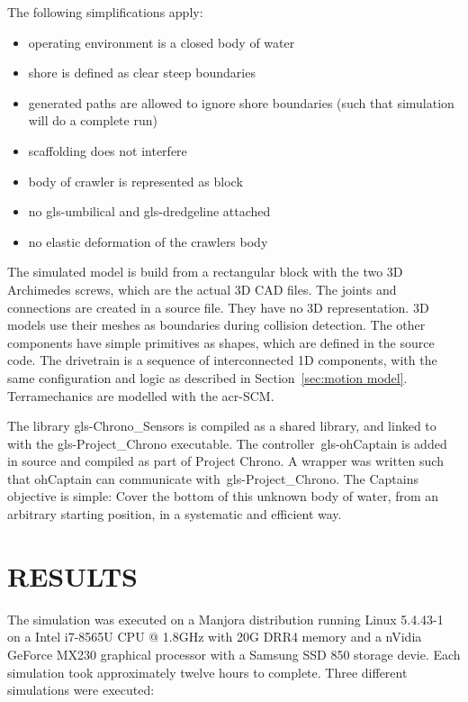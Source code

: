 \noindent The following simplifications apply:

\begin{itemize}
    \setlength\itemsep{0mm}
    \item operating environment is a closed body of water
    \item shore is defined as clear steep boundaries
    \item generated paths are allowed to ignore shore boundaries (such that simulation will do a complete run)
    \item scaffolding does not interfere
    \item body of crawler is represented as block
    \item no \gls{gls-umbilical} and \gls{gls-dredgeline} attached
    \item no elastic deformation of the crawlers body
\end{itemize}

The simulated model is build from a rectangular block with the two 3D Archimedes screws, which are the actual 3D CAD
files. The joints and connections are created in a source file. They have no 3D representation. 3D models use their
meshes as boundaries during collision detection. The other components have simple primitives as shapes, which are
defined in the source code. The drivetrain is a sequence of interconnected 1D components, with the same configuration
and logic as described in Section~\ref{sec:motion model}. Terramechanics are modelled with the \gls{acr-SCM}.

The library \gls{gls-Chrono_Sensors} is compiled as a shared library, and linked to with the \gls{gls-Project_Chrono}
executable. The controller~\gls{gls-ohCaptain} is added in source and compiled as part of Project Chrono. A wrapper
was written such that ohCaptain can communicate with~\gls{gls-Project_Chrono}. The Captains objective is simple: Cover
the bottom of this unknown body of water, from an arbitrary starting position, in a systematic and efficient way.


\section{RESULTS}\label{sec:results}

The simulation was executed on a Manjora distribution running Linux 5.4.43-1 on a Intel i7-8565U CPU @ 1.8GHz with 20G
DRR4 memory and a nVidia GeForce MX230 graphical processor with a Samsung SSD 850 storage devie. Each simulation took
approximately twelve hours to complete. Three different simulations were executed:

